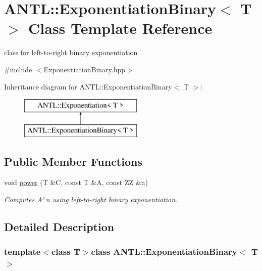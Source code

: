 \hypertarget{classANTL_1_1ExponentiationBinary}{\section{A\-N\-T\-L\-:\-:Exponentiation\-Binary$<$ T $>$ Class Template Reference}
\label{classANTL_1_1ExponentiationBinary}
}


class for left-\/to-\/right binary exponentiation  




{\ttfamily \#include $<$Exponentiation\-Binary.\-hpp$>$}

Inheritance diagram for A\-N\-T\-L\-:\-:Exponentiation\-Binary$<$ T $>$\-:\begin{figure}[H]
\begin{center}
\leavevmode
\includegraphics[height=2.000000cm]{d8/d7d/classANTL_1_1ExponentiationBinary}
\end{center}
\end{figure}
\subsection*{Public Member Functions}
\begin{DoxyCompactItemize}
\item 
void \hyperlink{classANTL_1_1ExponentiationBinary_a039ea9d52144229d0728d81060d43fc4}{power} (T \&C, const T \&A, const Z\-Z \&n)
\begin{DoxyCompactList}\small\item\em Computes A$^\wedge$n using left-\/to-\/right binary exponentiation. \end{DoxyCompactList}\end{DoxyCompactItemize}


\subsection{Detailed Description}
\subsubsection*{template$<$class T$>$class A\-N\-T\-L\-::\-Exponentiation\-Binary$<$ T $>$}

